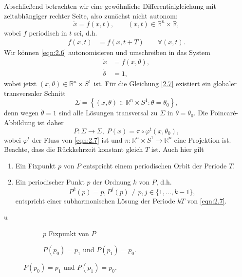 \documentclass[main.tex]{subfiles}
\begin{document}
Abschließend betrachten wir eine gewöhnliche Differentialgleichung mit zeitabhängiger rechter Seite, also zunächst nicht autonom:
\begin{equation}\label{eqn:2.6}
\dot x = f(x, t) , \qquad (x,t)\in ℝ^n \times ℝ,
\end{equation}
wobei $f$ periodisch in $t$ sei, d.h.
\begin{align*}
f(x,t) &= f(x, t+T) \qquad ∀(x,t).
\end{align*}
Wir können \eqref{eqn:2.6} autonomisieren und umschreiben in das System 
\begin{equation}
\label{eqn:2.7}
\begin{aligned}
\dot x &= f(x, θ), \\
\dot θ &= 1
,\end{aligned}
\end{equation}
wobei jetzt $(x,θ)\in ℝ^n \times S^1$ ist.
Für die Gleichung \eqref{2.7} existiert ein globaler transversaler Schnitt
$$Σ = \left \{ (x, θ)\in ℝ^n \times S^1: θ= θ_0 \right\},$$
denn wegen $\dot θ = 1$ sind alle Lösungen transversal zu $Σ$ in $θ=θ_0$.
Die Poincaré-Abbildung ist daher
$$P\colon Σ\to Σ,\; P(x) = π\circ φ^t(x, θ_0),$$
wobei $φ^t$ der Fluss von \eqref{eqn:2.7} ist und $π\colon ℝ^n\times S^1\to ℝ^n$ eine Projektion ist.
Beachte, dass die Rückkehrzeit konstant gleich $T$ ist.
Auch hier gilt
\begin{enumerate}
[label=(\alph*)]
\item Ein Fixpunkt $p$ von $P$ entspricht einem periodischen Orbit der Periode $T$.
\item Ein periodischer Punkt $p$ der Ordnung $k$ von $P$, d.h. 
$$P^k(p) = p, P^j(p) \ne p, j\in \{1,…, k-1 \},$$
entspricht einer subharmonischen Lösung der Periode $kT$ von \eqref{eqn:2.7}.
\end{enumerate} 
u
\begin{figure}[h!]
\begin{center}
\begin{subfigure}[b]{0.4\textwidth}
\resizebox{\linewidth}{!}{ 
}
\caption{$p$ Fixpunkt von $P$}
\end{subfigure}
\begin{subfigure}[b]{0.4\textwidth}
\resizebox{\linewidth}{!}{ 
}
\caption{$P(p_0) = p_1$ und $P(p_1) = p_0$.}
\end{subfigure}
\end{center}
\end{figure}

\setcounter{section}{4}
\end{document}
